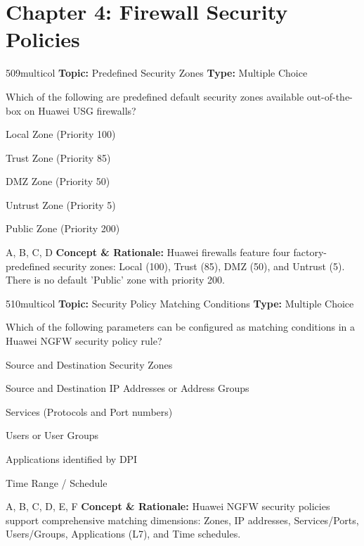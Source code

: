 \section{Chapter 4: Firewall Security Policies}

\begin{qcard}{509}{multicol}
\textcolor{darkslate!75}{\small\textbf{Topic:} Predefined Security Zones \hfill \textbf{Type:} Multiple Choice}\vspace{0.4em}\par
Which of the following are predefined default security zones available out-of-the-box on Huawei USG firewalls?
\begin{qoptions}
\item Local Zone (Priority 100)
\item Trust Zone (Priority 85)
\item DMZ Zone (Priority 50)
\item Untrust Zone (Priority 5)
\item Public Zone (Priority 200)
\end{qoptions}
\end{qcard}
\nopagebreak
\begin{explainbox}{A, B, C, D}
\textbf{Concept \& Rationale:} Huawei firewalls feature four factory-predefined security zones: Local (100), Trust (85), DMZ (50), and Untrust (5). There is no default 'Public' zone with priority 200.
\end{explainbox}

\begin{qcard}{510}{multicol}
\textcolor{darkslate!75}{\small\textbf{Topic:} Security Policy Matching Conditions \hfill \textbf{Type:} Multiple Choice}\vspace{0.4em}\par
Which of the following parameters can be configured as matching conditions in a Huawei NGFW security policy rule?
\begin{qoptions}
\item Source and Destination Security Zones
\item Source and Destination IP Addresses or Address Groups
\item Services (Protocols and Port numbers)
\item Users or User Groups
\item Applications identified by DPI
\item Time Range / Schedule
\end{qoptions}
\end{qcard}
\nopagebreak
\begin{explainbox}{A, B, C, D, E, F}
\textbf{Concept \& Rationale:} Huawei NGFW security policies support comprehensive matching dimensions: Zones, IP addresses, Services/Ports, Users/Groups, Applications (L7), and Time schedules.
\end{explainbox}

